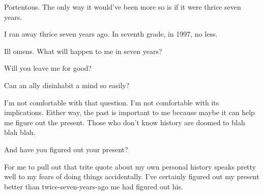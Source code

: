 \begin{paracol}{2}
\begin{leftcolumn}
\begin{ally}
Portentous. The only way it would've been more so is if it were thrice seven years.
\end{ally}
I ran away thrice seven years ago. In seventh grade, in 1997, no less.

\begin{ally}
Ill omens. What will happen to me in seven years?
\end{ally}
Will you leave me for good?

\begin{ally}
Can an ally disinhabit a mind so easily?
\end{ally}
I'm not comfortable with that question. I'm not comfortable with its implications. Either way, the past is important to me because maybe it can help me figure out the present. Those who don't know history are doomed to blah blah blah.

\begin{ally}
And have you figured out your present?
\end{ally}
For me to pull out that trite quote about my own personal history speaks pretty well to my fears of doing things accidentally. I've certainly figured out my present better than twice-seven-years-ago me had figured out his.

\newpage
\end{leftcolumn}
\end{paracol}

